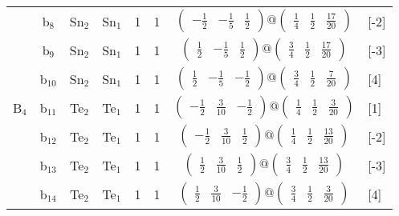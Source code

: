 \documentclass[fleqn,10pt,landscape]{article}
\begin{document}
\begin{itemize}
\begin{center}
\begin{longtable}{cc|cc|c|c|c|l}
& b$_{8}$ & Sn$_{2}$ & Sn$_{1}$ & 1 & 1 & $\begin{pmatrix} - \frac{1}{2} & - \frac{1}{5} & \frac{1}{2} \end{pmatrix}@\begin{pmatrix} \frac{1}{4} & \frac{1}{2} & \frac{17}{20} \end{pmatrix}$ & [-2] \\
& b$_{9}$ & Sn$_{2}$ & Sn$_{1}$ & 1 & 1 & $\begin{pmatrix} \frac{1}{2} & - \frac{1}{5} & \frac{1}{2} \end{pmatrix}@\begin{pmatrix} \frac{3}{4} & \frac{1}{2} & \frac{17}{20} \end{pmatrix}$ & [-3] \\
& b$_{10}$ & Sn$_{2}$ & Sn$_{1}$ & 1 & 1 & $\begin{pmatrix} \frac{1}{2} & - \frac{1}{5} & - \frac{1}{2} \end{pmatrix}@\begin{pmatrix} \frac{3}{4} & \frac{1}{2} & \frac{7}{20} \end{pmatrix}$ & [4] \\ \hline
B$_{4}$ & b$_{11}$ & Te$_{2}$ & Te$_{1}$ & 1 & 1 & $\begin{pmatrix} - \frac{1}{2} & \frac{3}{10} & - \frac{1}{2} \end{pmatrix}@\begin{pmatrix} \frac{1}{4} & \frac{1}{2} & \frac{3}{20} \end{pmatrix}$ & [1] \\
& b$_{12}$ & Te$_{2}$ & Te$_{1}$ & 1 & 1 & $\begin{pmatrix} - \frac{1}{2} & \frac{3}{10} & \frac{1}{2} \end{pmatrix}@\begin{pmatrix} \frac{1}{4} & \frac{1}{2} & \frac{13}{20} \end{pmatrix}$ & [-2] \\
& b$_{13}$ & Te$_{2}$ & Te$_{1}$ & 1 & 1 & $\begin{pmatrix} \frac{1}{2} & \frac{3}{10} & \frac{1}{2} \end{pmatrix}@\begin{pmatrix} \frac{3}{4} & \frac{1}{2} & \frac{13}{20} \end{pmatrix}$ & [-3] \\
& b$_{14}$ & Te$_{2}$ & Te$_{1}$ & 1 & 1 & $\begin{pmatrix} \frac{1}{2} & \frac{3}{10} & - \frac{1}{2} \end{pmatrix}@\begin{pmatrix} \frac{3}{4} & \frac{1}{2} & \frac{3}{20} \end{pmatrix}$ & [4] \\
\end{longtable}
\end{center}


\end{itemize}
\end{document}
